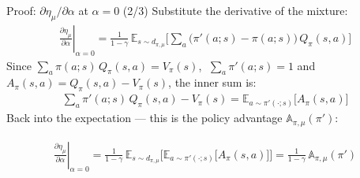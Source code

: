 \documentclass[aspectratio=169]{beamer}
\newcommand{\E}{\mathbb{E}}
\newcommand{\PA}{\mathbb{A}}              %
\begin{document}
\begin{frame}{Proof: $\partial\eta_\mu/\partial\alpha$ at $\alpha=0$ \;(2/3)}
  Substitute the derivative of the mixture:
  \begin{gather*}
    \left.\frac{\partial\eta_\mu}{\partial\alpha}\right|_{\alpha=0}
    = \frac{1}{1-\gamma}\,\E_{s\sim d_{\pi,\mu}}\Big[\sum_a \big(\pi'(a;s)-\pi(a;s)\big)\,Q_\pi(s,a)\Big]
  \end{gather*}
  Since $\sum_a \pi(a;s)\,Q_\pi(s,a) = V_\pi(s)$, $\;\sum_a\pi'(a;s)=1$ and $A_\pi(s,a) = Q_\pi(s,a)-V_\pi(s)$, the inner sum is:
  \begin{gather*}
    \sum_a \pi'(a;s)\,Q_\pi(s,a) - V_\pi(s) = \E_{a\sim\pi'(\cdot;s)}\big[A_\pi(s,a)\big]
  \end{gather*}
  Back into the expectation --- this is the policy advantage $\PA_{\pi,\mu}(\pi')$:
  \begin{formulabox}
    \begin{gather*}
      \left.\frac{\partial\eta_\mu}{\partial\alpha}\right|_{\alpha=0}
      = \frac{1}{1-\gamma}\,\E_{s\sim d_{\pi,\mu}}\Big[\E_{a\sim\pi'(\cdot;s)}\big[A_\pi(s,a)\big]\Big]
      = \frac{1}{1-\gamma}\,\PA_{\pi,\mu}(\pi')
    \end{gather*}
  \end{formulabox}
\end{frame}
\end{document}
